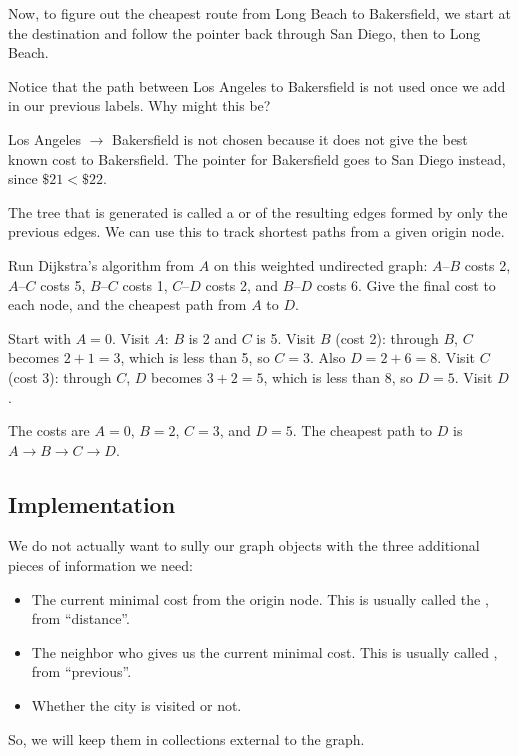 Now, to figure out the cheapest route from Long Beach to Bakersfield,
we start at the destination and follow the  pointer back
through San Diego, then to Long Beach. 
\begin{Exercise}[title={Expanding on the Delivery Graph}, label={ex:deliv_1}]
Notice that the path between Los Angeles to Bakersfield is not used once we add in our previous labels. Why might this be?
\end{Exercise}
\begin{Answer}[ref={ex:deliv_1}]
Los Angeles $\rightarrow$ Bakersfield is not chosen because it does not give the best known cost to Bakersfield. The  pointer for Bakersfield goes to San Diego instead, since $\mathdollar21 < \mathdollar22$.

The tree that is generated is called a  or  of the resulting edges formed by only the previous edges. We can use this to track shortest paths from a given origin node.
\end{Answer}
\begin{Exercise}[title={Dijkstra's Algorithm by Hand}, label={ex:dijk2}]
Run Dijkstra's algorithm from $A$ on this weighted undirected graph: $A$–$B$ costs 2, $A$–$C$ costs 5, $B$–$C$ costs 1, $C$–$D$ costs 2, and $B$–$D$ costs 6. Give the final cost to each node, and the cheapest path from $A$ to $D$.
\end{Exercise}
\begin{Answer}[ref={ex:dijk2}]
Start with $A = 0$. Visit $A$: $B$ is 2 and $C$ is 5. Visit $B$ (cost 2): through $B$, $C$ becomes $2 + 1 = 3$, which is less than 5, so $C = 3$. Also $D = 2 + 6 = 8$. Visit $C$ (cost 3): through $C$, $D$ becomes $3 + 2 = 5$, which is less than 8, so $D = 5$. Visit $D$.

The costs are $A = 0$, $B = 2$, $C = 3$, and $D = 5$. The cheapest path to $D$ is $A \rightarrow B \rightarrow C \rightarrow D$.
\end{Answer}

\subsection{Implementation}

We do not actually want to sully our graph objects with the three additional pieces of information we need:
\begin{itemize}
    \item The current minimal cost from the origin node. This is usually
          called the , from ``distance''.
    \item The neighbor who gives us the current minimal cost. This is
          usually called , from ``previous''.
    \item Whether the city is visited or not.
\end{itemize}
So, we will keep them in collections external to the graph.

